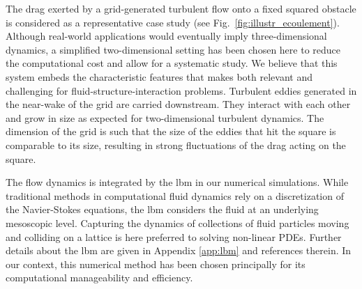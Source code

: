 \documentclass{jfm}
\newcommand{\EL}[1]{{\color{myred}{#1}}}
\begin{document}
%
The drag exerted by a grid-generated turbulent flow onto a fixed squared obstacle is considered as a representative case study (see Fig.~\ref{fig:illustr_ecoulement}). 
%
Although real-world applications would eventually imply three-dimensional dynamics, a simplified two-dimensional setting has been chosen here to reduce the computational cost and allow for a systematic study. 
% 
We believe that this system embeds the characteristic features that makes 
 \EL{this study} both relevant and challenging for fluid-structure-interaction problems. 
%
Turbulent eddies generated in the near-wake of the grid are carried downstream.
They interact with each other and grow in size as expected for two-dimensional turbulent dynamics. 
The dimension of the grid is such that the size of the eddies that hit the square is comparable to its size, resulting in strong fluctuations of the drag acting on the square. 
%
%
%

%
The flow dynamics is integrated by the \ac{lbm} in our numerical simulations. 
While traditional methods in computational fluid dynamics rely on a discretization of the Navier-Stokes equations, the \ac{lbm} considers the fluid at an underlying  mesoscopic level.
Capturing the dynamics of collections of fluid particles moving and colliding on a lattice is here preferred to solving non-linear PDEs. 
Further details about the \ac{lbm} are given in Appendix \ref{app:lbm} and references therein.
In our context, this numerical method has been chosen principally for its computational manageability and efficiency. 
\end{document}
